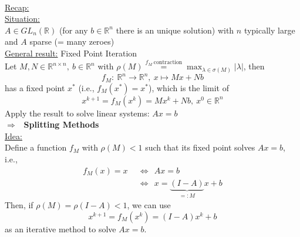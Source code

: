 \begin{frame}
	~\\
	{\blank
	\underline{Recap:}\\
	\underline{Situation:}\\
	$A\in GL_n(\mathbb{R})$ (for any $b\in\mathbb{R}^n$ there is an unique solution) with $n$ typically large and $A$ sparse (= many zeroes)\\
	\underline{General result:} Fixed Point Iteration\\
	Let $M,N\in\mathbb{R}^{n\times n},~b\in\mathbb{R}^n$ with $\rho(M)\stackrel{f_M~\text{contraction}}{=}\max_{\lambda\in\sigma(M)}|\lambda|$, then
	$$
	f_M:~\mathbb{R}^n\rightarrow\mathbb{R}^n,~x\mapsto Mx+Nb
	$$
	has a fixed point $x^*$ (i.e., $f_M(x^*)=x^*$), which is the limit of
	$$
	x^{k+1}=f_M(x^k)=Mx^k+Nb,~x^0\in\mathbb{R}^n
	$$
	Apply the result to solve linear systems: $Ax=b$\\
	$\Rightarrow~~$ \textbf{Splitting Methods}\\
	\underline{Idea:}\\
	Define a function $f_M$ with $\rho(M)<1$ such that its fixed point solves $Ax=b$, i.e.,
	\begin{align*}
	f_M(x)=x~~&\Leftrightarrow~~Ax=b\\
	&\Leftrightarrow~~x=\underbrace{(I-A)}_{=:M}x+b
	\end{align*}
	Then, if $\rho(M)=\rho(I-A)<1$, we can use
	$$
	x^{k+1}=f_M(x^k)=(I-A)x^k+b
	$$
	as an iterative method to solve $Ax=b$.
}
\end{frame}